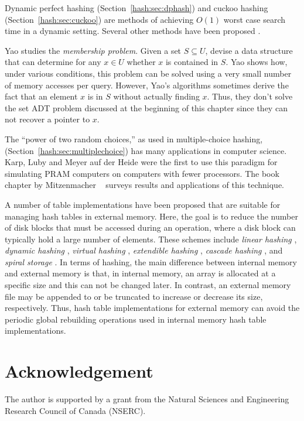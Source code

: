 Dynamic perfect hashing (Section~\ref{hash:sec:dphash}) and cuckoo
hashing (Section~\ref{hash:sec:cuckoo}) are methods of achieving
$O(1)$ worst case search time in a dynamic setting.  Several other
methods have been proposed  \cite{dm90,dgmp92,bm99}.
 
Yao \cite{y81} studies the \emph{membership problem}.  Given a set $S\subseteq U$, devise a data structure that
can determine for any $x\in U$ whether $x$ is contained in $S$. Yao
shows how, under various conditions, this problem can be solved using
a very small number of memory accesses per query.  However, Yao's
algorithms sometimes derive the fact that an element $x$ is in $S$
without actually finding $x$.  Thus, they don't solve the set ADT
problem discussed at the beginning of this chapter since they can not
recover a pointer to $x$.

The ``power of two random choices,'' as used in multiple-choice
hashing, (Section~\ref{hash:sec:multiplechoice}) has many applications
in computer science.  Karp, Luby and Meyer auf der Heide
\cite{klm92,klm93} were the first to use this paradigm for simulating
PRAM computers on computers with fewer processors. The book chapter by
Mitzenmacher \etal\ \cite{mrs01} surveys results and applications of
this technique.

A number of table implementations have been proposed that are suitable
for managing hash tables in external memory.  Here, the goal is to reduce
the number of disk blocks that must be accessed during an operation,
where a disk block can typically hold a large number of elements.
These schemes include \emph{linear
hashing} \cite{l80},
\emph{dynamic hashing}
\cite{l78}, \emph{virtual hashing} \cite{lit78}, \emph{extendible
hashing}
\cite{fnps79},  \emph{cascade
hashing} \cite{kz84},
and \emph{spiral storage} \cite{m85}.  In terms of hashing, the main difference between
internal memory and external memory is that, in internal memory, an
array is allocated at a specific size and this can not be changed
later.  In contrast, an external memory file may be appended to or be
truncated to increase or decrease its size, respectively.  Thus, hash
table implementations for external memory can avoid the periodic
global rebuilding operations used in internal memory hash table
implementations.

\section*{Acknowledgement}

The author is supported by a grant from the Natural Sciences and
Engineering Research Council of Canada (NSERC).

%


